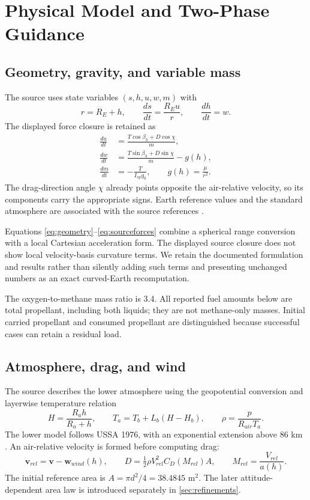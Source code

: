 \documentclass[11pt,a4paper]{article}
\newcommand{\vect}[1]{\bm{#1}}
\begin{document}
\section{Physical Model and Two-Phase Guidance}
\subsection{Geometry, gravity, and variable mass}
The source uses state variables $(s,h,u,w,m)$ with
\begin{equation}
 r=R_E+h,\qquad \frac{ds}{dt}=\frac{R_Eu}{r},\qquad \frac{dh}{dt}=w.
\label{eq:geometry}
\end{equation}
The displayed force closure is retained as
\begin{align}
 \frac{du}{dt}&=\frac{T\cos\beta_h+D\cos\chi}{m},\\
 \frac{dw}{dt}&=\frac{T\sin\beta_h+D\sin\chi}{m}-g(h),\\
 \frac{dm}{dt}&=-\frac{T}{I_{sp}g_0},\qquad
 g(h)=\frac{\mu}{r^2}.
\label{eq:sourceforces}
\end{align}
The drag-direction angle $\chi$ already points opposite the air-relative velocity, so its components carry the appropriate signs. Earth reference values and the standard atmosphere are associated with the source references \cite{ussa,earth,iers}.

Equations \eqref{eq:geometry}--\eqref{eq:sourceforces} combine a spherical range conversion with a local Cartesian acceleration form. The displayed source closure does not show local velocity-basis curvature terms. We retain the documented formulation and results rather than silently adding such terms and presenting unchanged numbers as an exact curved-Earth recomputation.

The oxygen-to-methane mass ratio is 3.4. All reported fuel amounts below are total propellant, including both liquids; they are not methane-only masses. Initial carried propellant and consumed propellant are distinguished because successful cases can retain a residual load.

\subsection{Atmosphere, drag, and wind}
The source describes the lower atmosphere using the geopotential conversion and layerwise temperature relation
\begin{equation}
 H=\frac{R_ah}{R_a+h},\qquad
 T_a=T_b+L_b(H-H_b),\qquad \rho=\frac{p}{R_{air}T_a}.
\label{eq:atmo}
\end{equation}
The lower model follows USSA 1976, with an exponential extension above 86 km \cite{ussa}. An air-relative velocity is formed before computing drag:
\begin{equation}
 \vect v_{rel}=\vect v-\vect w_{wind}(h),\qquad
 D=\tfrac12\rho V_{rel}^2C_D(M_{rel})A,\qquad
 M_{rel}=\frac{V_{rel}}{a(h)}.
\end{equation}
The initial reference area is $A=\pi d^2/4=38.4845$ m$^2$. The later attitude-dependent area law is introduced separately in \cref{sec:refinements}.
\end{document}
